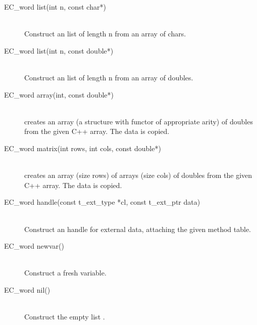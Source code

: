 \begin{description}
\item[EC_word list(int n, const char*)]\ \\
	Construct an {\eclipse} list of length n from an array of chars.

\item[EC_word list(int n, const double*)]\ \\
	Construct an {\eclipse} list of length n from an array of doubles.

\item[EC_word array(int, const double*)]\ \\
	creates an {\eclipse} array (a structure with functor \nil of
	appropriate arity) of doubles from the given C++ array.
	The data is copied.

\item[EC_word matrix(int rows, int cols, const double*)]\ \\
	creates an {\eclipse} array (size rows) of arrays (size cols) of doubles
	from the given C++ array.  The data is copied.

\item[EC_word handle(const t_ext_type *cl, const t_ext_ptr data)]\ \\
	Construct an {\eclipse} handle for external data, attaching the
	given method table.

\item[EC_word newvar()]\ \\
	Construct a fresh {\eclipse} variable.

\item[EC_word nil()]\ \\
	Construct the empty list \nil.
\end{description}

